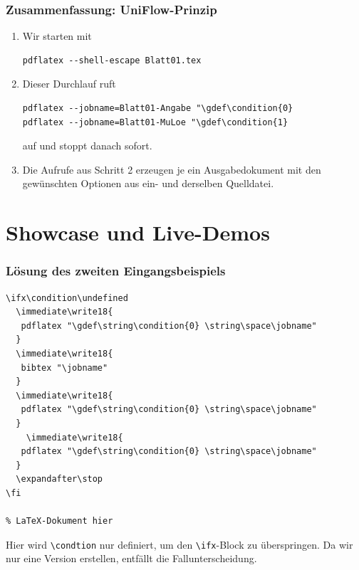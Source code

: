\documentclass[]{beamer}
\begin{document}
\begin{frame}[fragile]
\frametitle{Zusammenfassung: UniFlow-Prinzip}

\begin{enumerate}[<+->]
\item Wir starten mit
\begin{lstlisting}[style=arn:lst:bash]
pdflatex --shell-escape Blatt01.tex
\end{lstlisting}
\item Dieser Durchlauf ruft
\begin{lstlisting}[style=arn:lst:bash]
pdflatex --jobname=Blatt01-Angabe "\gdef\condition{0} 
pdflatex --jobname=Blatt01-MuLoe "\gdef\condition{1} 
\end{lstlisting}
auf und stoppt danach sofort.
\item Die Aufrufe aus Schritt 2 erzeugen je ein Ausgabedokument mit den gewünschten Optionen aus ein- und derselben Quelldatei.
\end{enumerate}
\end{frame}

\section{Showcase und Live-Demos}

\begin{frame}[fragile]
\frametitle{Lösung des zweiten Eingangsbeispiels}

\begin{center}
\begin{lstlisting}[style=arn:lst:tex]
\ifx\condition\undefined
  \immediate\write18{
   pdflatex "\gdef\string\condition{0} \string\space\jobname"
  }
  \immediate\write18{
   bibtex "\jobname"
  }
  \immediate\write18{
   pdflatex "\gdef\string\condition{0} \string\space\jobname"
  }
    \immediate\write18{
   pdflatex "\gdef\string\condition{0} \string\space\jobname"
  }
  \expandafter\stop
\fi

% LaTeX-Dokument hier
\end{lstlisting}
\end{center}

Hier wird \verb+\condtion+ nur definiert, um den \verb+\ifx+-Block zu überspringen. Da wir nur eine Version erstellen, entfällt die Fallunterscheidung.

\end{frame}
\end{document}
